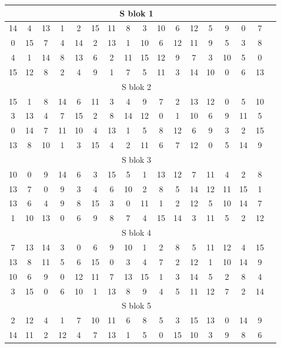 \documentclass[12p]{article}
\begin{document}
\begin{table}[H]
\centering
\begin{tabular}{|c|c|c|c|c|c|c|c|c|c|c|c|c|c|c|c|c|}
\hline
\multicolumn{16}{|c|}{S blok 1}\\ 
\hline
14&4&13&1&2&15&11&8&3&10&6&12&5&9&0&7 \\ \hline
0 &	15& 	7 &	4 &	14 &	2& 	13& 	1 &	10 &	6 &	12 &	11 &	9 &	5 &	3 &	8 \\ \hline
4 &	1 &	14 &	8 	&13 	&6 &	2& 	11& 	15& 	12 &	9 	&7& 	3& 	10& 	5& 	0 \\ \hline
15 &	12& 	8 &	2 &	4 &	9 &	1 &	7 &	5 &	11 &	3 &	14 &	10 &	0 &	6 &	13 \\ \hline
\multicolumn{16}{|c|}{S blok 2} \\ \hline
15 &	1 &	8 &	14 &	6 &	11 &	3 &	4 &	9 &	7 &	2 &	13 &	12 &	0 &	5 &	10 \\ \hline
3 &	13& 	4 &	7 &	15 &	2 &	8 &	14 &	12 &	0 &	1 &	10 &	6 &	9 &	11 &	5 \\ \hline
0 &	14 &	7 &	11 &	10 &	4 &	13 &	1 &	5 &	8 &	12 &	6 &	9 &	3 &	2 &	15 \\ \hline
13 &	8 &	10 &	1 &	3 &	15 &	4 &	2 &	11 &	6 &	7 &	12 &	0 &	5 &	14 &	9 \\ \hline
\multicolumn{16}{|c|}{S blok 3}\\ \hline
10 &	0 &	9 &	14 &	6 &	3 &	15 &	5 &	1 &	13 &	12 &	7 &	11 &	4 &	2 &	8\\ \hline
13 &	7 &	0 &	9 &	3 &	4 &	6 &	10 &	2 &	8 &	5 &	14 &	12 &	11 &	15 &	1\\ \hline
13 &	6 &	4 &	9 &	8 &	15 &	3 &	0 &	11 &	1 &	2 &	12 &	5 &	10 &	14 &	7\\ \hline
1 &	10 &	13 &	0 &	6 &	9 &	8 &	7 &	4 &	15 &	14 &	3 &	11 &	5 &	2 &	12 \\ \hline
\multicolumn{16}{|c|}{S blok 4}\\ \hline
7 &	13 &	14 &	3 &	0 &	6 &	9 &	10 &	1 &	2& 	8& 	5& 	11& 	12& 	4& 	15\\ \hline
13& 	8& 	11& 	5& 	6& 	15& 	0& 	3& 	4& 	7& 	2& 	12& 	1& 	10& 	14& 	9\\ \hline
10& 	6& 	9& 	0& 	12& 	11& 	7& 	13& 	15& 	1& 	3& 	14& 	5& 	2& 	8& 	4\\ \hline
3& 	15& 	0& 	6& 	10& 	1& 	13& 	8& 	9& 	4& 	5& 	11& 	12& 	7& 	2& 	14\\ \hline
\multicolumn{16}{|c|}{S blok 5}\\ \hline
2& 	12& 	4& 	1& 	7& 	10& 	11& 	6& 	8& 	5& 	3& 	15& 	13& 	0& 	14& 	9\\ \hline
14& 	11& 	2& 	12& 	4& 	7& 	13& 	1& 	5& 	0& 	15& 	10& 	3& 	9& 	8& 	6\\ \hline

\end{tabular}
\end{table}
\end{document}

